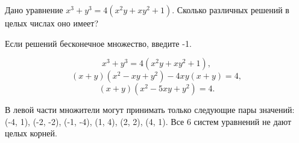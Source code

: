 
Дано уравнение $x^3+y^3=4(x^2y+xy^2+1)$. Сколько различных решений в целых числах оно имеет?

Если решений бесконечное множество, введите -1.

\solutionSection

$$x^3 + y^3 = 4(x^2y + xy^2 + 1),$$
$$(x+y)(x^2-xy+y^2) - 4xy(x + y) = 4,$$
$$(x+y)(x^2-5xy+y^2) = 4.$$

В левой части множители могут принимать только следующие пары значений: (-4, 1), (-2, -2), (-1, -4), (1, 4), (2, 2), (4, 1). Все 6 систем уравнений не дают целых корней.

